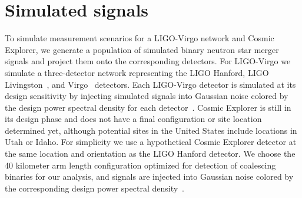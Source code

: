 \section{Simulated signals}\label{sec:population}

To simulate measurement scenarios for a LIGO-Virgo network and Cosmic Explorer, we generate a population of simulated binary neutron star merger signals and project them onto the corresponding detectors. For LIGO-Virgo we simulate a three-detector network representing the LIGO Hanford, LIGO Livingston~\cite{TheLIGOScientific:2016agk,Buikema:2020dlj}, and Virgo~\cite{TheVirgo:2014hva} detectors. Each LIGO-Virgo detector is simulated at its design sensitivity by injecting simulated signals into Gaussian noise colored by the design power spectral density for each detector~\cite{Aasi:2013wya}. Cosmic Explorer is still in its design phase and does not have a final configuration or site location determined yet, although potential sites in the United States include locations in Utah or Idaho. For simplicity we use a hypothetical Cosmic Explorer detector at the same location and orientation as the LIGO Hanford detector. We choose the 40 kilometer arm length configuration optimized for detection of coalescing binaries for our analysis, and signals are injected into Gaussian noise colored by the corresponding design power spectral density~\cite{CE:NoiseCurves}.

